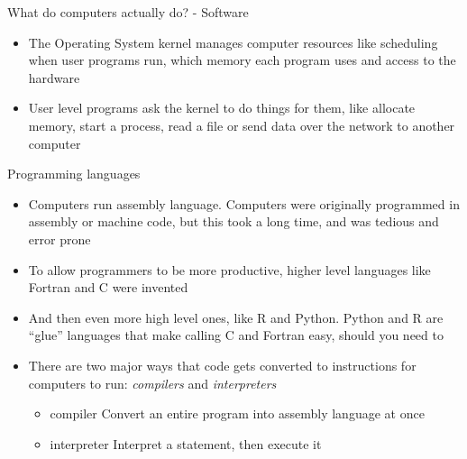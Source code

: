 \documentclass{beamer}
\begin{document}
\begin{frame}{What do computers actually do? - Software}
	\begin{itemize}
		\item The Operating System kernel manages computer resources like scheduling when
			user programs run, which memory each program uses and access to the hardware
		\item User level programs ask the kernel to do things for
			them, like allocate memory, start a process, read a file or send data over the
			network to another computer
	\end{itemize}
\end{frame}

\begin{frame}{Programming languages}
	\begin{itemize}	
		\item Computers run assembly language. Computers were originally programmed in assembly or machine code, but this took a long time, and was tedious and error prone
		\item To allow programmers to be more productive, higher level languages like Fortran and C were invented
\item  And then even more high level ones, like R and Python. Python and R are ``glue'' languages that make calling C and Fortran easy, should you need to
		\item There are two major ways that code gets converted to instructions for computers to run: \emph{compilers} and \emph{interpreters}
			\begin{itemize}
				\item{compiler} Convert an entire program into assembly language at once
				\item{interpreter} Interpret a statement, then execute it
			\end{itemize}
	\end{itemize}
\end{frame}
\end{document}
